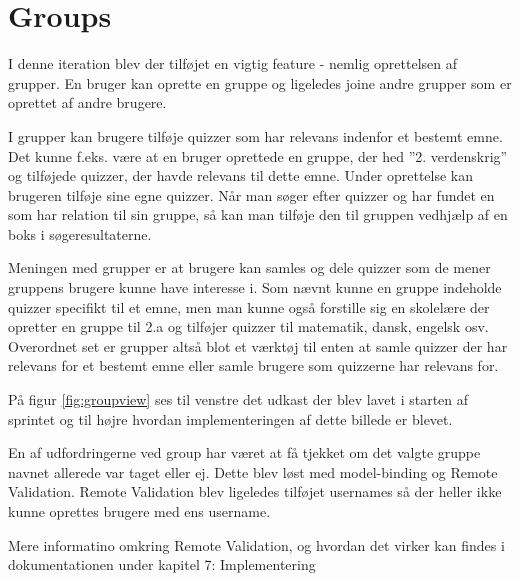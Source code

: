 \section{Groups}

I denne iteration blev der tilføjet en vigtig feature - nemlig oprettelsen af grupper.
En bruger kan oprette en gruppe og ligeledes joine andre grupper som er oprettet af andre brugere.

I grupper kan brugere tilføje quizzer som har relevans indenfor et bestemt emne. Det kunne f.eks. være at en bruger oprettede en gruppe, der hed ''2. verdenskrig'' og tilføjede quizzer, der havde relevans til dette emne. Under oprettelse kan brugeren tilføje sine egne quizzer. Når man søger efter quizzer og har fundet en som har relation til sin gruppe, så kan man tilføje den til gruppen vedhjælp af en boks i søgeresultaterne.

Meningen med grupper er at brugere kan samles og dele quizzer som de mener gruppens brugere kunne have interesse i.  Som nævnt kunne en gruppe indeholde quizzer specifikt til et emne, men man kunne også forstille sig en skolelære der opretter en gruppe til 2.a og tilføjer quizzer til matematik, dansk, engelsk osv. Overordnet set er grupper altså blot et værktøj til enten at samle quizzer der har relevans for et bestemt emne eller samle brugere som quizzerne har relevans for.


På figur \ref{fig:groupview} ses til venstre det udkast der blev lavet i starten af sprintet og til højre hvordan implementeringen af dette billede er blevet.

En af udfordringerne ved group har været at få tjekket om det valgte gruppe navnet allerede var taget eller ej. Dette blev løst med model-binding og Remote Validation. Remote Validation blev ligeledes tilføjet usernames så der heller ikke kunne oprettes brugere med ens username.

Mere informatino omkring Remote Validation, og hvordan det virker kan findes i dokumentationen under kapitel 7: Implementering

